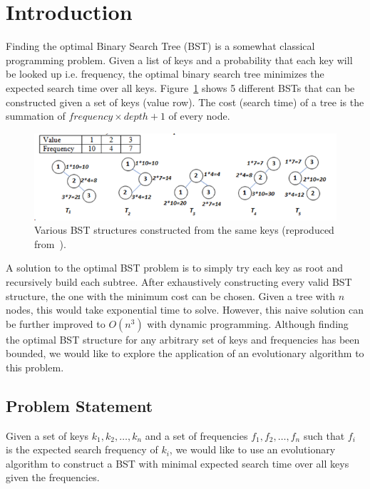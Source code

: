 
\section{Introduction}

Finding the optimal Binary Search Tree (BST) is a somewhat classical programming problem. Given a list of keys and a probability that each key will be looked up i.e. frequency, the optimal binary search tree minimizes the expected search time over all keys. Figure~\ref{fig:opt-bst} shows 5 different BSTs that can be constructed given a set of keys (value row). The cost (search time) of a tree is the summation of $frequency \times depth + 1$ of every node.

\begin{figure}[h]
    \centering
    \includegraphics[width=0.8\columnwidth]{figures/opt_bst.png}
    \caption{ \small Various BST structures constructed from the same keys (reproduced from~\cite{bst_figure}).}
    \label{fig:opt-bst}
\end{figure}

A solution to the optimal BST problem is to simply try each key as root and recursively build each subtree. After exhaustively constructing every valid BST structure, the one with the minimum cost can be chosen. Given a tree with $n$ nodes, this would take exponential time to solve. However, this naive solution can be further improved to $O(n^3)$ with dynamic programming. Although finding the optimal BST structure for any arbitrary set of keys and frequencies has been bounded, we would like to explore the application of an evolutionary algorithm to this problem.

\subsection{Problem Statement}

Given a set of keys $k_1,k_2,\dots,k_n$ and a set of frequencies $f_1,f_2,\dots,f_n$ such that $f_i$ is the expected search frequency of $k_i$, we would like to use an evolutionary algorithm to construct a BST with minimal expected search time over all keys given the frequencies.
